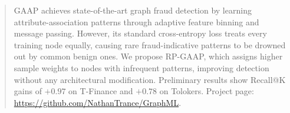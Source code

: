 \begin{abstract}
GAAP achieves state-of-the-art graph fraud detection by learning attribute-association patterns through adaptive feature binning and message passing. However, its standard cross-entropy loss treats every training node equally, causing rare fraud-indicative patterns to be drowned out by common benign ones. We propose RP-GAAP, which assigns higher sample weights to nodes with infrequent patterns, improving detection without any architectural modification. Preliminary results show Recall@K gains of $+0.97$ on T-Finance and $+0.78$ on Tolokers. Project page: \url{https://github.com/NathanTrance/GraphML}.
\end{abstract}
